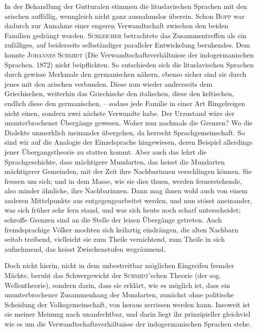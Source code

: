 In der Behandlung der Gutturalen stimmen die lituslavischen Sprachen mit den arischen auffällig, wenngleich nicht ganz ausnahmslos überein. Schon \textsc{Bopp} war dadurch zur Annahme einer engeren Verwandtschaft zwischen den beiden Familien gedrängt worden. \textsc{Schleicher} betrachtete das Zusammentreffen als ein zufälliges, auf beiderseits selbständiger paralleler Entwickelung beruhendes. Dem konnte \textsc{Johannes Schmidt} (Die Verwandtschaftsverhältnisse der indogermanischen Sprachen. 1872) nicht beipflichten. So entschieden sich die lituslavischen Sprachen durch gewisse Merkmale den germanischen nähern, ebenso sicher sind sie durch \label{fp.175} jenes mit den arischen verbunden. Diese nun wieder andrerseits dem Griechischen, weiterhin das Griechische den italischen, diese den keltischen, endlich diese den germanischen, – sodass jede Familie in einer Art Ringelreigen nicht einen, sondern zwei nächste Verwandte habe. Der Urzustand wäre der ununterbrochener Übergänge gewesen. Woher nun nachmals die Grenzen? Wo die Dialekte unmerklich ineinander übergehen, da herrscht Sprachgemeinschaft. So sind wir auf die Analogie der Einzelsprache hingewiesen, deren Beispiel allerdings jener Übergangstheorie zu statten kommt. Aber auch das lehrt die Sprachgeschichte, dass mächtigere Mundarten, das heisst die Mundarten mächtigerer Gemeinden, mit der Zeit ihre Nachbarinnen verschlingen können. Sie fressen um sich; und in dem Masse, wie sie dies thuen, werden fernerstehende, also minder ähnliche, ihre Nachbarinnen. Dann mag ihnen wohl auch von einem anderen Mittelpunkte aus entgegengearbeitet werden, und nun stösst aneinander, was sich früher sehr fern stand, und was sich heute noch scharf unterscheidet; schroffe Grenzen sind an die Stelle der leisen Übergänge getreten. Auch fremdsprachige Völker mochten sich keilartig eindrängen, die alten Nachbarn seitab treibend, vielleicht sie zum Theile vernichtend, zum Theile in sich aufnehmend, das heisst Zwischenstufen wegräumend.

Doch nicht hierin, nicht in dem unbestreitbar möglichen Eingreifen fremder Mächte, beruht das Schwergewicht der \textsc{Schmidt}’schen Theorie (der sog. Wellentheorie), sondern darin, dass sie erklärt, wie es möglich ist, dass ein ununter\label{sp.165}brochener Zusammenhang der Mundarten, zunächst ohne politische Scheidung der Volksgemeinschaft, von  heraus zerrissen werden kann. Insoweit ist sie meiner Meinung nach unanfechtbar, und darin liegt ihr prinzipieller  gleichviel wie es um die Verwandtschaftsverhältnisse der indogermanischen Sprachen stehe.


